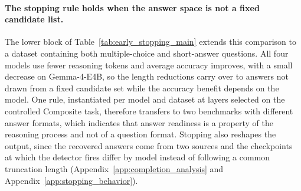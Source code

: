 \documentclass{article} %
\begin{document}
\paragraph{The stopping rule holds when the answer space is not a fixed candidate list.}
The lower block of Table~\ref{tab:early_stopping_main} extends this comparison to a dataset containing both multiple-choice and short-answer questions. All four models use fewer reasoning tokens and average accuracy improves, with a small decrease on Gemma-4-E4B, so the length reductions carry over to answers not drawn from a fixed candidate set while the accuracy benefit depends on the model. One rule, instantiated per model and dataset at layers selected on the controlled Composite task, therefore transfers to two benchmarks with different answer formats, which indicates that answer readiness is a property of the reasoning process and not of a question format. Stopping also reshapes the output, since the recovered answers come from two sources and the checkpoints at which the detector fires differ by model instead of following a common truncation length (Appendix~\ref{app:completion_analysis} and Appendix~\ref{app:stopping_behavior}).
\end{document}
